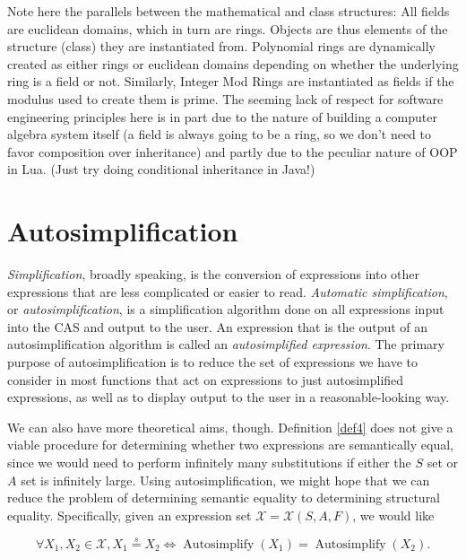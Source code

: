 \documentclass{article}
\theoremstyle{definition}
\DeclareMathOperator{\Autosimplify}{Autosimplify}
\begin{document}
Note here the parallels between the mathematical and class structures: All fields are euclidean domains, which in turn are rings. Objects are thus elements of the structure (class) they are instantiated from. Polynomial rings are dynamically created as either rings or euclidean domains depending on whether the underlying ring is a field or not. Similarly, Integer Mod Rings are instantiated as fields if the modulus used to create them is prime. The seeming lack of respect for software engineering principles here is in part due to the nature of building a computer algebra system itself (a field is always going to be a ring, so we don't need to favor composition over inheritance) and partly due to the peculiar nature of OOP in Lua. (Just try doing conditional inheritance in Java!)

\newpage

\section{Autosimplification}

\textit{Simplification}, broadly speaking, is the conversion of expressions into other expressions that are less complicated or easier to read. \textit{Automatic simplification}, or \textit{autosimplification}, is a simplification algorithm done on all expressions input into the CAS and output to the user. \cite{casc2} An expression that is the output of an autosimplification algorithm is called an \textit{autosimplified expression}. The primary purpose of autosimplification is to reduce the set of expressions we have to consider in most functions that act on expressions to just autosimplified expressions, as well as to display output to the user in a reasonable-looking way.

We can also have more theoretical aims, though. Definition \ref{def4} does not give a viable procedure for determining whether two expressions are semantically equal, since we would need to perform infinitely many substitutions if either the $S$ set or $A$ set is infinitely large. Using autosimplification, we might hope that we can reduce the problem of determining semantic equality to determining structural equality. Specifically, given an expression set $\mathcal{X} = \mathcal{X}(S,A,F)$, we would like

\begin{equation*}
    \forall X_1, X_2 \in \mathcal{X}, X_1 \overset{s}{=} X_2 \iff \Autosimplify(X_1) = \Autosimplify(X_2).
\end{equation*}
\end{document}

